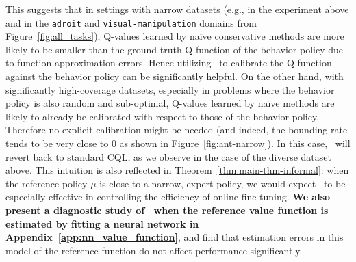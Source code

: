 This suggests that in settings with narrow datasets (e.g., in the experiment above and in the \texttt{adroit} and \texttt{visual-manipulation} domains from Figure~\ref{fig:all_tasks}), Q-values learned by na\"ive conservative methods are more likely to be smaller than the ground-truth Q-function of the behavior policy due to function approximation errors. Hence utilizing \methodname\ to calibrate the Q-function against the behavior policy can be significantly helpful. On the other hand, with significantly high-coverage datasets, especially in problems where the behavior policy is also random and sub-optimal, Q-values learned by na\"ive methods are likely to already be calibrated with respect to those of the behavior policy. Therefore no explicit calibration might be needed (and indeed, the bounding rate tends to be very close to 0 as shown in Figure~\ref{fig:ant-narrow}). In this case, \methodname\ will revert back to standard CQL, as we observe in the case of the diverse dataset above. This intuition is also reflected in Theorem~\ref{thm:main-thm-informal}: when the reference policy $\mu$ is close to a narrow, expert policy, we would expect \methodname\ to be especially effective in controlling the efficiency of online fine-tuning. \textbf{We also present a diagnostic study of \methodname\ when the reference value function is estimated by fitting a neural network in Appendix~\ref{app:nn_value_function}}, and find that estimation errors in this model of the reference function do not affect performance significantly. 




\vspace{-0.2cm}